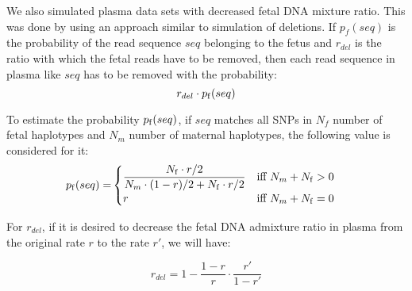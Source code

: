 	We also simulated plasma data sets with decreased fetal DNA mixture ratio. This was done by using an approach similar to simulation of deletions. If $p_f(seq)$ is the probability of the read sequence $seq$ belonging to the fetus and $r_{del}$ is the ratio with which the fetal reads have to be removed, then each read sequence in plasma like $seq$ has to be removed with the probability:
	$$r_{del} \cdot p_{\mathrm{f}}(seq) $$

To estimate the probability $p_{\mathrm{f}}(seq)$, if $seq$ matches all SNPs in $N_f$ number of fetal haplotypes and $N_m$ number of maternal haplotypes, the following value is considered for it: 
\begin{align*}
p_\f(seq) =& 
  \begin{cases}
    \mathlarger{\frac{ N_\f \cdot r/2 }{ N_m \cdot (1-r)/2 + N_\f \cdot r/2}} & \text{iff } N_m+N_\f>0 \\
    r & \text{iff } N_m+N_\f=0
  \end{cases}
\end{align*}
	
	
	 For $r_{del}$, if it is desired to decrease the fetal DNA admixture ratio in plasma from the original rate $r$ to the rate $r'$, we will have:

$$r_{del} = 1 - \frac{1-r}{r} \cdot \frac{r'}{1-r'}  $$



	 

